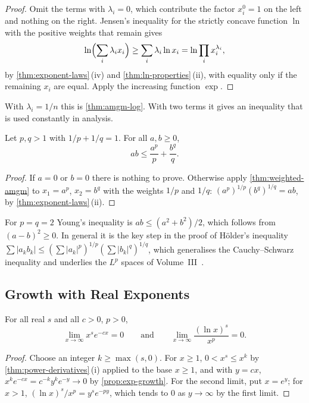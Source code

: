 \begin{proof}
Omit the terms with $\lambda_i=0$, which contribute the factor $x_i^0=1$ on the left and nothing on the right. Jensen's inequality for the strictly concave function $\ln$ with the positive weights that remain gives
\[
\ln\Bigl(\sum_i\lambda_ix_i\Bigr)\ge\sum_i\lambda_i\ln x_i=\ln\prod_ix_i^{\lambda_i},
\]
by \cref{thm:exponent-laws}\,(iv) and \cref{thm:ln-properties}\,(ii), with equality only if the remaining $x_i$ are equal. Apply the increasing function $\exp$.
\end{proof}

With $\lambda_i=1/n$ this is \cref{thm:amgm-log}. With two terms it gives an inequality that is used constantly in analysis.

\begin{corollary}
\label{cor:young}
Let $p,q>1$ with $1/p+1/q=1$. For all $a,b\ge0$,
\[
ab\le\frac{a^p}p+\frac{b^q}q .
\]
\end{corollary}

\begin{proof}
If $a=0$ or $b=0$ there is nothing to prove. Otherwise apply \cref{thm:weighted-amgm} to $x_1=a^p$, $x_2=b^q$ with the weights $1/p$ and $1/q$: $(a^p)^{1/p}(b^q)^{1/q}=ab$, by \cref{thm:exponent-laws}\,(ii).
\end{proof}

For $p=q=2$ Young's inequality is $ab\le(a^2+b^2)/2$, which follows from $(a-b)^2\ge0$. In general it is the key step in the proof of H\"older's inequality $\sum|a_kb_k|\le(\sum|a_k|^p)^{1/p}(\sum|b_k|^q)^{1/q}$, which generalises the Cauchy--Schwarz inequality and underlies the $L^p$ spaces of Volume~III~\cite{hardy1952inequalities}.

\subsection{Growth with Real Exponents}

\begin{proposition}
\label{prop:real-growth}
For all real $s$ and all $c>0$, $p>0$,
\[
\lim_{x\to\infty}x^se^{-cx}=0\qquad\text{and}\qquad\lim_{x\to\infty}\frac{(\ln x)^s}{x^p}=0 .
\]
\end{proposition}

\begin{proof}
Choose an integer $k\ge\max(s,0)$. For $x\ge1$, $0<x^s\le x^k$ by \cref{thm:power-derivatives}\,(i) applied to the base $x\ge1$, and with $y=cx$, $x^ke^{-cx}=c^{-k}y^ke^{-y}\to0$ by \cref{prop:exp-growth}. For the second limit, put $x=e^y$; for $x>1$, $(\ln x)^s/x^p=y^se^{-py}$, which tends to $0$ as $y\to\infty$ by the first limit.
\end{proof}

